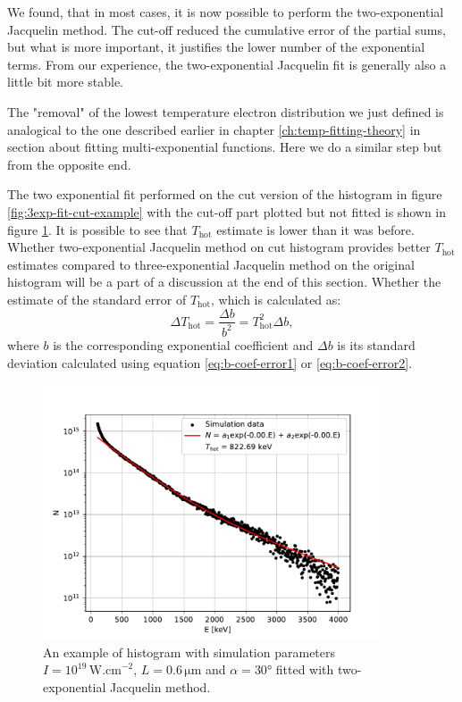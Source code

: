 We found, that in most cases, it is now possible to perform the two-exponential Jacquelin method. The cut-off reduced the cumulative error of the partial sums, but what is more important, it justifies the lower number of the exponential terms. From our experience, the two-exponential Jacquelin fit is generally also a little bit more stable. 

The "removal" of the lowest temperature electron distribution we just defined is analogical to the one described earlier in chapter \ref{ch:temp-fitting-theory} in section about fitting multi-exponential functions. Here we do a similar step but from the opposite end.

The two exponential fit performed on the cut version of the histogram in figure \ref{fig:3exp-fit-cut-example} with the cut-off part plotted but not fitted is shown in figure \ref{fig:2exp-fit-example}. It is possible to see that $T_{\mathrm{hot}}$ estimate is lower than it was before. Whether two-exponential Jacquelin method on cut histogram provides better $T_{\mathrm{hot}}$ estimates compared to three-exponential Jacquelin method on the original histogram will be a part of a discussion at the end of this section. Whether the estimate of the standard error of $T_{\mathrm{hot}}$, which is calculated as:
\begin{equation}
	\label{eq:t-hot-error}
	\Delta T_\mathrm{hot} = \frac{\Delta b}{b^2} = T_\mathrm{hot}^2\Delta b,
\end{equation}
where $b$ is the corresponding exponential coefficient and $\Delta b$ is its standard deviation calculated using equation \ref{eq:b-coef-error1} or \ref{eq:b-coef-error2}.

\begin{figure}[t]
	\centering
	\includegraphics[width=0.9\textwidth]{figures/hist_1e19_060_30_2exp}
	\caption{An example of histogram with simulation parameters $I=10^{19}\,\mathrm{W.cm}^{-2}$, $L=0.6\,\mathrm{\mu m}$ and $\alpha = 30$° fitted with two-exponential Jacquelin method.}
	\label{fig:2exp-fit-example}
\end{figure}

